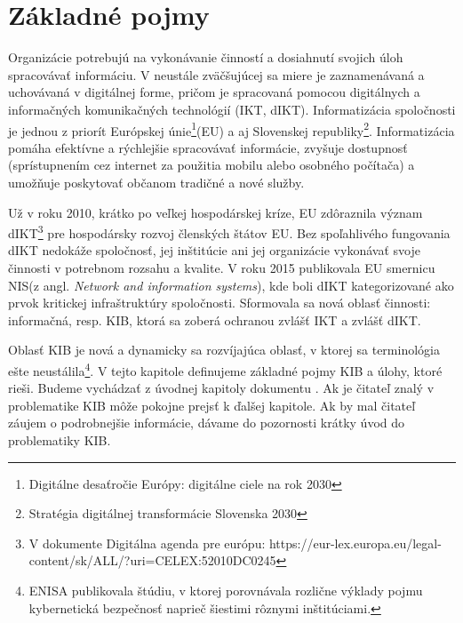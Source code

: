 \chapter{Základné pojmy}

Organizácie potrebujú na vykonávanie činností a dosiahnutí svojich úloh spracovávať informáciu. V neustále zväčšujúcej
sa miere je zaznamenávaná a uchovávaná v digitálnej forme, pričom je spracovaná pomocou digitálnych a informačných komunikačných
technológií (\acrshort{IKT}, \acrshort{dIKT}). 
Informatizácia spoločnosti je jednou z priorít Európskej únie\footnote{Digitálne desaťročie Európy: digitálne ciele na 
rok 2030}(\acrshort{EU}) a aj Slovenskej republiky\footnote{Stratégia digitálnej transformácie Slovenska 2030}. Informatizácia
pomáha efektívne a rýchlejšie spracovávať informácie, zvyšuje dostupnosť (sprístupnením cez internet za použitia mobilu
alebo osobného počítača) a umožňuje poskytovať občanom tradičné a nové služby.

Už v roku 2010, krátko po veľkej hospodárskej kríze, \acrshort{EU} zdôraznila význam \acrshort{dIKT}\footnote{V dokumente
Digitálna agenda pre európu: https://eur-lex.europa.eu/legal-content/sk/ALL/?uri=CELEX:52010DC0245} pre hospodársky rozvoj
členských štátov \acrshort{EU}. Bez spoľahlivého fungovania \acrshort{dIKT} nedokáže spoločnosť, jej inštitúcie ani jej
organizácie vykonávať svoje činnosti v potrebnom rozsahu a kvalite. V roku 2015 publikovala \acrshort{EU} smernicu 
NIS(z angl. \textit{Network and information systems}), kde boli \acrshort{dIKT} kategorizované ako prvok kritickej
infraštruktúry spoločnosti. Sformovala sa nová oblasť činnosti: informačná, resp. \acrfull{KIB}, ktorá sa zoberá ochranou 
zvlášť \acrshort{IKT} a zvlášť \acrshort{dIKT}.

Oblasť KIB je nová a dynamicky sa rozvíjajúca oblasť, v ktorej sa terminológia ešte neustálila\footnote{\acrshort{ENISA}
publikovala štúdiu, v ktorej porovnávala rozlične výklady pojmu kybernetická bezpečnosť naprieč šiestimi rôznymi inštitúciami.}.
V tejto kapitole definujeme základné pojmy \acrshort{KIB} a úlohy, ktoré rieši. Budeme vychádzať z úvodnej kapitoly dokumentu
\cite{KomentarZoKB}. Ak je čitateľ znalý v problematike \acrshort{KIB} môže pokojne prejsť k ďalšej kapitole. Ak by mal čitateľ
záujem o podrobnejšie informácie, dávame do pozornosti krátky úvod do problematiky \acrshort{KIB}\cite{KUDIKB-MVS}.

